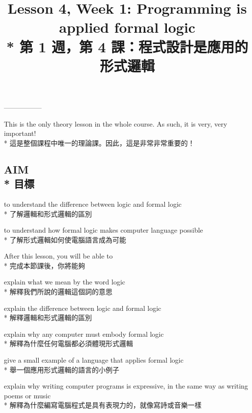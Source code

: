 \documentclass[]{article}
\begin{document}
\author{}  \date{}
\title{{\color{gray}Lesson 4, Week 1: Programming is applied formal logic}
\\*
{第 1 週，第 4 課：程式設計是應用的形式邏輯}}
\maketitle

\vspace{-2cm}
-----------------

{\color{gray}This is the only theory lesson in the whole course. As such, it is very, very important!}
\\*
{這是整個課程中唯一的理論課。因此，這是非常非常重要的！}

\begin{flushleft}
	\section*{{\color{gray}AIM}
	\\*
	{目標}}
\end{flushleft}

{\large
\begin{description}
	\setlength{\itemindent}{-18pt}
	\item[---] {\color{gray}to understand the difference between logic and formal logic}
	\\*
	{了解邏輯和形式邏輯的區別}
	\item[---] {\color{gray}to understand how formal logic makes computer language possible}
	\\*
	{了解形式邏輯如何使電腦語言成為可能}
\end{description}
}
{\color{gray}After this lesson, you will be able to}
\\*
完成本節課後，你將能夠
\begin{description}
	\setlength{\itemindent}{-12pt}
	\item[*] {\color{gray}explain what we mean by the word logic}
	\\*
	{解釋我們所說的邏輯這個詞的意思}
	\item[*] {\color{gray}explain the difference between logic and formal logic}
	\\*
	{解釋邏輯和形式邏輯的區別}
	\item[*] {\color{gray}explain why any computer must embody formal logic}
	\\*
	{解釋為什麼任何電腦都必須體現形式邏輯} 
	\item[*] {\color{gray}give a small example of a language that applies formal logic}
	\\*
	{舉一個應用形式邏輯的語言的小例子}
	\item[*] {\color{gray}explain why writing computer programs is expressive, in the same way as writing poems or music}
	\\*
	{解釋為什麼編寫電腦程式是具有表現力的，就像寫詩或音樂一樣}
\end{description}
\end{document}

